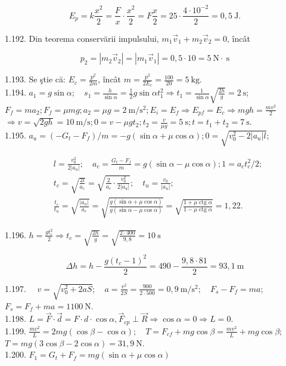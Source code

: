 \documentclass[10pt]{article}
\begin{document}
$$
E_{p}=k \frac{x^{2}}{2}=\frac{F}{x} \cdot \frac{x^{2}}{2}=F \frac{x}{2}=25 \cdot \frac{4 \cdot 10^{-2}}{2}=0,5 \mathrm{~J} .
$$

1.192. Din teorema conservării impulsului, $m_{1} \vec{v}_{1}+m_{2} \vec{v}_{2}=0$, încât

$$
p_{2}=\left|m_{2} \vec{v}_{2}\right|=\left|m_{1} \vec{v}_{1}\right|=0,5 \cdot 10=5 \mathrm{~N} \cdot \mathrm{~s}
$$

1.193. Se ştie că: $E_{c}=\frac{p^{2}}{2 m}$, încât $m=\frac{p^{2}}{2 E_{c}}=\frac{100}{20}=5 \mathrm{~kg}$.\\
1.194. $a_{1}=g \sin \alpha ; \quad s_{1}=\frac{h}{\sin \alpha}=\frac{1}{2} g \sin \alpha t_{1}^{2} \Rightarrow t_{1}=\frac{1}{\sin \alpha} \sqrt{\frac{2 h}{g}}=2 \mathrm{~s}$;\\
$F_{f}=m a_{2} ; F_{f}=\mu m g ; a_{2}=\mu g=2 \mathrm{~m} / \mathrm{s}^{2} ; E_{i}=E_{f} \Rightarrow E_{p f}=E_{c} \Rightarrow m g h=\frac{m v^{2}}{2}$\\
$\Rightarrow v=\sqrt{2 g h}=10 \mathrm{~m} / \mathrm{s} ; 0=v-\mu g t_{2} ; t_{2}=\frac{v}{\mu g}=5 \mathrm{~s} ; t=t_{1}+t_{2}=7 \mathrm{~s}$.\\
1.195. $a_{u}=\left(-G_{t}-F_{f}\right) / m=-g(\sin \alpha+\mu \cos \alpha) ; 0=\sqrt{v_{0}^{2}-2\left|a_{u}\right| l}$;

$$
\begin{aligned}
& l=\frac{v_{0}^{2}}{2\left|a_{u}\right|} ; \quad a_{c}=\frac{G_{t}-F_{f}}{m}=g(\sin \alpha-\mu \cos \alpha) ; 1=a_{c} t_{c}^{2} / 2 ; \\
& t_{c}=\sqrt{\frac{2 l}{a_{c}}}=\sqrt{\frac{2}{a_{c}} \cdot \frac{v_{0}^{2}}{2\left|a_{u}\right|}} ; \quad t_{u}=\frac{v_{0}}{\left|a_{u}\right|} ; \\
& \frac{t_{c}}{t_{u}}=\sqrt{\frac{\left|a_{u}\right|}{a_{c}}}=\sqrt{\frac{g(\sin \alpha+\mu \cos \alpha)}{g(\sin \alpha-\mu \cos \alpha)}}=\sqrt{\frac{1+\mu \operatorname{ctg} \alpha}{1-\mu \operatorname{ctg} \alpha}}=1,22 .
\end{aligned}
$$

1.196. $h=\frac{g t_{c}^{2}}{2} \Rightarrow t_{c}=\sqrt{\frac{2 h}{g}}=\sqrt{\frac{2 \cdot 400}{9,8}}=10 \mathrm{~s}$

$$
\Delta h=h-\frac{g\left(t_{c}-1\right)^{2}}{2}=490-\frac{9,8 \cdot 81}{2}=93,1 \mathrm{~m}
$$

1.197. $\quad v=\sqrt{v_{0}^{2}+2 a S} ; \quad a=\frac{v^{2}}{2 S}=\frac{900}{2 \cdot 500}=0,9 \mathrm{~m} / \mathrm{s}^{2} ; \quad F_{s}-F_{f}=m a$; $F_{s}=F_{f}+m a=1100 \mathrm{~N}$.\\
1.198. $L=\vec{F} \cdot \vec{d}=F \cdot d \cdot \cos \alpha, \vec{F}_{c p} \perp \vec{R} \Rightarrow \cos \alpha=0 \Rightarrow L=0$.\\
1.199. $\frac{m v^{2}}{L}=2 m g(\cos \beta-\cos \alpha) ; \quad T=F_{c f}+m g \cos \beta=\frac{m v^{2}}{L}+m g \cos \beta ;$ $T=m g(3 \cos \beta-2 \cos \alpha)=31,9 \mathrm{~N}$.\\
1.200. $F_{1}=G_{t}+F_{f}=m g(\sin \alpha+\mu \cos \alpha)$
\end{document}
